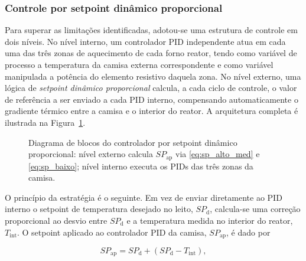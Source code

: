 \subsubsection{Controle por setpoint dinâmico proporcional}

Para superar as limitações identificadas, adotou-se uma estrutura de controle
em dois níveis. No nível interno, um controlador PID independente atua em cada
uma das três zonas de aquecimento de cada forno reator, tendo como variável de
processo a temperatura da camisa externa correspondente e como variável
manipulada a potência do elemento resistivo daquela zona. No nível externo, uma
lógica de \emph{setpoint dinâmico proporcional} calcula, a cada ciclo de
controle, o valor de referência a ser enviado a cada PID interno, compensando
automaticamente o gradiente térmico entre a camisa e o interior do reator. A
arquitetura completa é ilustrada na Figura~\ref{fig:blocos_controle}.

\begin{figure}[ht]
\begin{center}
\caption{Diagrama de blocos do controlador por setpoint dinâmico proporcional:
nível externo calcula $SP_{\mathrm{ap}}$ via \eqref{eq:sp_alto_med} e
\eqref{eq:sp_baixo}; nível interno executa os PIDs das três zonas da camisa.}
\label{fig:blocos_controle}
\end{center}
\end{figure}

O princípio da estratégia é o seguinte. Em vez de enviar diretamente ao PID
interno o setpoint de temperatura desejado no leito, $SP_{\mathrm{d}}$,
calcula-se uma correção proporcional ao desvio entre $SP_{\mathrm{d}}$ e a
temperatura medida no interior do reator, $T_{\mathrm{int}}$. O setpoint
aplicado ao controlador PID da camisa, $SP_{\mathrm{ap}}$, é dado por

\begin{equation}
  SP_{\mathrm{ap}} = SP_{\mathrm{d}} + \left(SP_{\mathrm{d}} - T_{\mathrm{int}}\right),
  \label{eq:sp_dinamico}
\end{equation}

